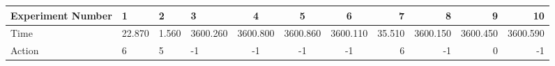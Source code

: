 \documentclass[8pt]{article}
\begin{document}
\begin{landscape}
\begin{tabular}{ | l | l | l | l | c | c | c | r | r | r | r | }
 \hline 
Experiment Number & 1 & 2 & 3 & 4 & 5 & 6 & 7 & 8 & 9 & 10\\ \hline
Time & 22.870 & 1.560 & 3600.260 & 3600.800 & 3600.860 & 3600.110 & 35.510 & 3600.150 & 3600.450 & 3600.590\\ \hline
Action & 6 & 5 & -1 & -1 & -1 & -1 & 6 & -1 & 0 & -1\\ \hline\end{tabular}
\end{landscape}
\end{document}
